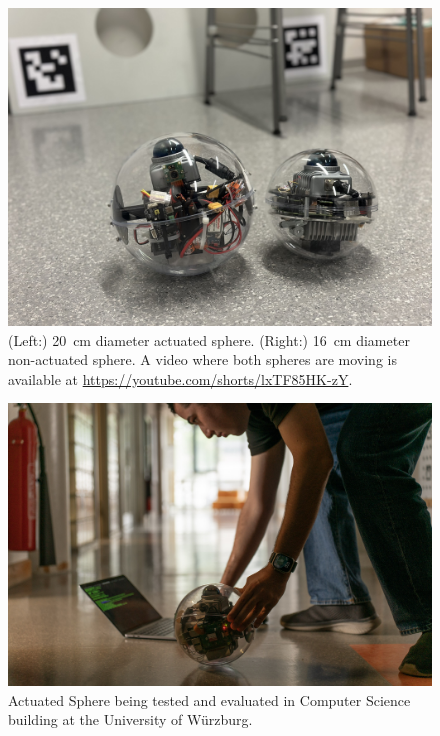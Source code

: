 \documentclass[english, bachelor, utf8]{base/thesis_telematics}
\begin{document}
\begin{figure}[h]
\centerline{\includegraphics[width=0.8\columnwidth]{pics/two_spheres.jpg}}
\caption{(Left:) \SI{20}{\centi\meter} diameter actuated sphere.
(Right:) \SI{16}{\centi\meter} diameter non-actuated sphere.
A video where both spheres are moving is available at \url{https://youtube.com/shorts/lxTF85HK-zY}.}

\label{fig:twospheres}
\end{figure}

\begin{figure}[h]
\centerline{\includegraphics[width=0.8\columnwidth]{pics/marosphere_pic3.jpg}}
\caption{Actuated Sphere being tested and evaluated in Computer Science building at the University of Würzburg.}
\label{fig:test}
\end{figure}
\end{document}
